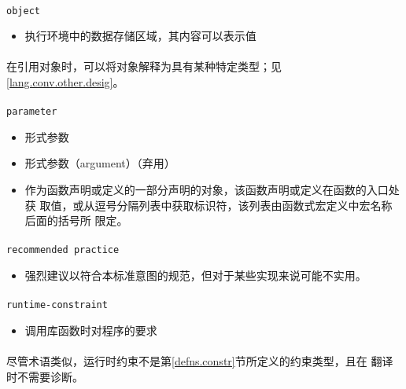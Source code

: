 \paragraph{}
\texttt{object}
\begin{itemize}
  \item[]{执行环境中的数据存储区域，其内容可以表示值}
\end{itemize}

\paragraph{}
\notes* 在引用对象时，可以将对象解释为具有某种特定类型；见
\ref{lang.conv.other.desig}。

\paragraph{}
\texttt{parameter}
\begin{itemize}
  \item[]{形式参数}
  \item[]{形式参数（argument）（弃用）}
  \item[]{作为函数声明或定义的一部分声明的对象，该函数声明或定义在函数的入口处获
    取值，或从逗号分隔列表中获取标识符，该列表由函数式宏定义中宏名称后面的括号所
    限定。}
\end{itemize}

\paragraph{}
\texttt{recommended practice}
\begin{itemize}
  \item[]{强烈建议以符合本标准意图的规范，但对于某些实现来说可能不实用。}
\end{itemize}

\paragraph{}
\texttt{runtime-constraint}
\begin{itemize}
  \item[]{调用库函数时对程序的要求}
\end{itemize}

\paragraph{}
\notes 尽管术语类似，运行时约束不是第\ref{defns.constr}节所定义的约束类型，且在
翻译时不需要诊断。

